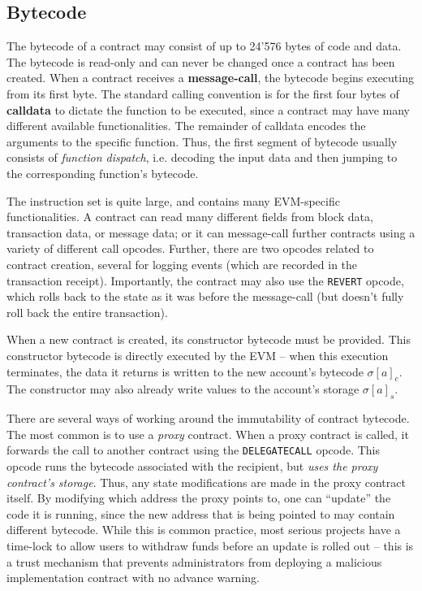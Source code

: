 \subsection{Bytecode}
The bytecode of a contract may consist of up to 24'576 bytes of code and data. The bytecode is read-only and can never be changed once a contract has been created. When a contract receives a \textbf{message-call}, the bytecode begins executing from its first byte. The standard calling convention is for the first four bytes of \textbf{calldata} to dictate the function to be executed, since a contract may have many different available functionalities. The remainder of calldata encodes the arguments to the specific function. Thus, the first segment of bytecode usually consists of \textit{function dispatch}, i.e. decoding the input data and then jumping to the corresponding function's bytecode.
\par
The instruction set is quite large, and contains many EVM-specific functionalities. A contract can read many different fields from block data, transaction data, or message data; or it can message-call further contracts using a variety of different call opcodes. Further, there are two opcodes related to contract creation, several for logging events (which are recorded in the transaction receipt). Importantly, the contract may also use the \lstinline{REVERT} opcode, which rolls back to the state as it was before the message-call (but doesn't fully roll back the entire transaction).
\par
When a new contract is created, its constructor bytecode must be provided. This constructor bytecode is directly executed by the EVM -- when this execution terminates, the data it returns is written to the new account's bytecode $\sigma[a]_c$. The constructor may also already write values to the account's storage $\sigma[a]_s$.
\par
There are several ways of working around the immutability of contract bytecode. The most common is to use a \textit{proxy} contract. When a proxy contract is called, it forwards the call to another contract using the \lstinline{DELEGATECALL} opcode. This opcode runs the bytecode associated with the recipient, but \textit{uses the proxy contract's storage}. Thus, any state modifications are made in the proxy contract itself. By modifying which address the proxy points to, one can ``update'' the code it is running, since the new address that is being pointed to may contain different bytecode. While this is common practice, most serious projects have a time-lock to allow users to withdraw funds before an update is rolled out -- this is a trust mechanism that prevents administrators from deploying a malicious implementation contract with no advance warning.

